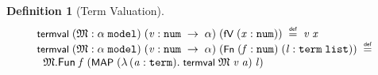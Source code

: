 \documentclass[letterpaper]{article}
\newtheorem{defn}{Definition}
\renewcommand{\HOLConst}[1]{{\textsf{\upshape\small #1}}}
\newenvironment{holmath}{\begin{displaymath}\begin{array}{l}}{\end{array}\end{displaymath}\ignorespacesafterend}
\begin{document}
\begin{defn}[Term Valuation]
\begin{holmath}
  \HOLConst{termval}\;(\HOLFreeVar{\ensuremath{\mathfrak{M}}} :\ensuremath{\alpha}\;\HOLTyOp{model})\;(\HOLFreeVar{v} :\HOLTyOp{num}\;\ensuremath{\rightarrow}\;\ensuremath{\alpha})\;(\HOLConst{fV}\;(\HOLFreeVar{x} :\HOLTyOp{num}))\;\HOLSymConst{\HOLTokenDefEquality{}}\;\HOLFreeVar{v}\;\HOLFreeVar{x}\\
\HOLConst{termval}\;(\HOLFreeVar{\ensuremath{\mathfrak{M}}} :\ensuremath{\alpha}\;\HOLTyOp{model})\;(\HOLFreeVar{v} :\HOLTyOp{num}\;\ensuremath{\rightarrow}\;\ensuremath{\alpha})\;(\HOLConst{Fn}\;(\HOLFreeVar{f} :\HOLTyOp{num})\;(\HOLFreeVar{l} :\HOLTyOp{term}\;\HOLTyOp{list}))\;\HOLSymConst{\HOLTokenDefEquality{}}\\
\;\;\HOLFreeVar{\ensuremath{\mathfrak{M}}}.\HOLFieldName{Fun}\;\HOLFreeVar{f}\;(\HOLConst{MAP}\;(\HOLTokenLambda{}(\HOLBoundVar{a} :\HOLTyOp{term}).\;\HOLConst{termval}\;\HOLFreeVar{\ensuremath{\mathfrak{M}}}\;\HOLFreeVar{v}\;\HOLBoundVar{a})\;\HOLFreeVar{l})
\end{holmath}
\end{defn}
\end{document}
